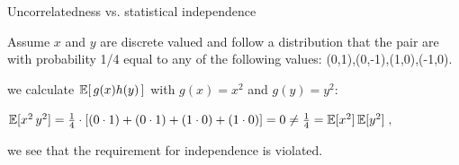 \begin{frame}{Uncorrelatedness vs. statistical independence}

Assume $x$ and $y$ are discrete valued and follow a distribution that the pair are with probability 1/4 equal to any of the following
values: (0,1),(0,-1),(1,0),(-1,0). 


\pause

we calculate $\mathbb{E}  \lbrack \, g(x) h(y) \, \rbrack$ with $g(x)=x^2$ and $g(y)=y^2$:\\

\svspace{3mm}

$\mathbb{E} \lbrack x^2 \, y^2 \rbrack 
= \frac{1}{4} \cdot \lbrack (0\cdot1) + (0\cdot1) + (1\cdot0) + (1\cdot0) \rbrack = 0 
\ne \frac{1}{4} = \mathbb{E} \lbrack x^2 \rbrack \, \mathbb{E} \lbrack y^2 \rbrack \;,$

\pause

we see that the requirement for independence is violated. 


\end{frame}

\clearpage

